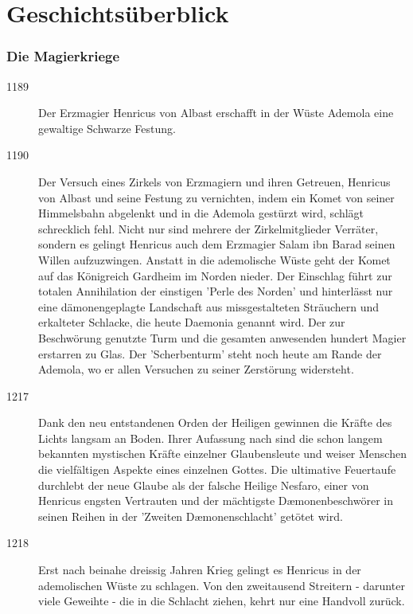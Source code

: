 \documentclass[12pt,twoside,twocolumn,openany]{book}
\begin{document}
\newpage
\section{Geschichtsüberblick}
	
\subsubsection{Die Magierkriege}
\begin{description}
	\item[1189] Der Erzmagier Henricus von Albast erschafft in der Wüste Ademola eine gewaltige Schwarze Festung.
	\item[1190] Der Versuch eines Zirkels von Erzmagiern und ihren Getreuen, Henricus von Albast und seine Festung zu vernichten, indem ein Komet von seiner Himmelsbahn abgelenkt und in die Ademola gestürzt wird, schlägt schrecklich fehl. Nicht nur sind mehrere der Zirkelmitglieder Verräter, sondern es gelingt Henricus auch dem Erzmagier Salam ibn Barad seinen Willen aufzuzwingen. Anstatt in die ademolische Wüste geht der Komet auf das Königreich Gardheim im Norden nieder. Der Einschlag führt zur totalen Annihilation der einstigen 'Perle des Norden' und hinterlässt nur eine dämonengeplagte Landschaft aus missgestalteten Sträuchern und erkalteter Schlacke, die heute Daemonia genannt wird. Der zur Beschwörung genutzte Turm und die gesamten anwesenden hundert Magier erstarren zu Glas. Der 'Scherbenturm' steht noch heute am Rande der Ademola, wo er allen Versuchen zu seiner Zerstörung widersteht.
	\item[1217] Dank den neu entstandenen Orden der Heiligen gewinnen die Kräfte des Lichts langsam an Boden. Ihrer Aufassung nach sind die schon langem bekannten mystischen Kräfte einzelner Glaubensleute und weiser Menschen die vielfältigen Aspekte eines einzelnen Gottes. Die ultimative Feuertaufe durchlebt der neue Glaube als der falsche Heilige Nesfaro, einer von Henricus engsten Vertrauten und der mächtigste D\ae monenbeschwörer in seinen Reihen in der 'Zweiten D\ae monenschlacht' getötet wird.
	\item[1218] Erst nach beinahe dreissig Jahren Krieg gelingt es Henricus in der ademolischen Wüste zu schlagen. Von den zweitausend Streitern - darunter viele Geweihte  - die in die Schlacht ziehen, kehrt nur eine Handvoll zurück.
\end{description}
	
\end{document}
